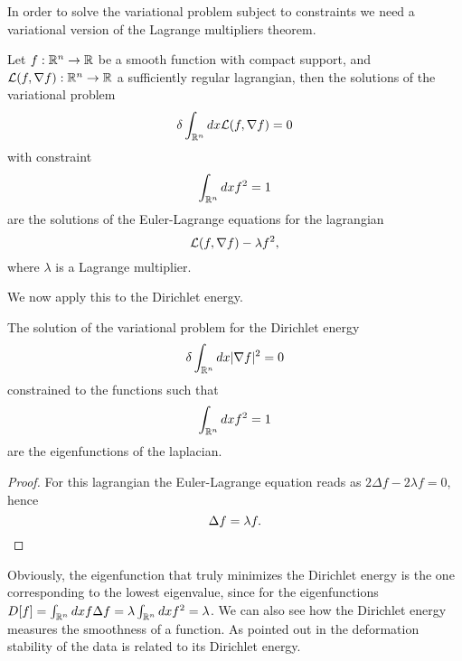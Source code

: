 \documentclass[../2.tex]{subfiles}
\begin{document}
In order to solve the variational problem subject to constraints we need a variational 
version of the Lagrange multipliers theorem.

\begin{prop}
    Let $f:\mathbb{R}^n \to \mathbb{R}$ be a smooth function with compact support, and $\mathcal{L}(f,\nabla f) : \mathbb{R}^n \to \mathbb{R}$ a sufficiently regular lagrangian,
    then the solutions of the variational problem 
    \[ \delta\int_{\mathbb{R}^n} dx \mathcal{L}(f,\nabla f) = 0 \]
    with constraint
    \[ \int_{\mathbb{R}^n} dx f^2 = 1 \]
    are the solutions of the Euler-Lagrange equations for the lagrangian
    \[ \mathcal{L}(f,\nabla f) - \lambda f^2, \]
    where $\lambda$ is a Lagrange multiplier.
\end{prop}

We now apply this to the Dirichlet energy.

\begin{prop}
    The solution of the variational problem for the Dirichlet energy
    \[ \delta\int_{\mathbb{R}^n} dx | \nabla f |^2 = 0 \]
    constrained to the functions such that 
    \[ \int_{\mathbb{R}^n} dx f^2 = 1 \]
    are the eigenfunctions of the laplacian.
\end{prop}
\begin{proof}
    For this lagrangian the Euler-Lagrange equation reads as $ 2 \Delta f - 2\lambda f = 0$,
    hence 
    \[ \Delta f = \lambda f . \qedhere \]

\end{proof}

Obviously, the eigenfunction that truly minimizes the Dirichlet energy is the one corresponding to the lowest eigenvalue,
since for the eigenfunctions $D[f] = \int_{\mathbb{R}^n} dx f \Delta f = \lambda \int_{\mathbb{R}^n} dx f^2 = \lambda$. We can also see how the Dirichlet energy
measures the smoothness of a function. As pointed out in \cite{2021geo} the deformation stability of the data is related to its Dirichlet energy.\\
\hfill \\


\end{document}
